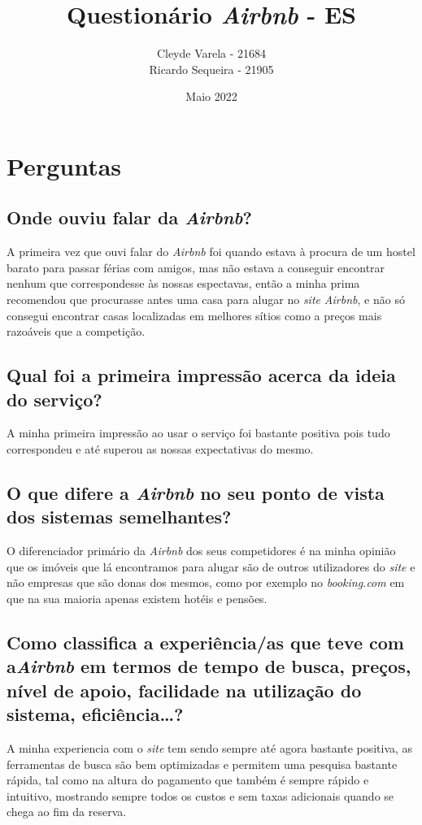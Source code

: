 \documentclass[a4paper]{article}
\title{Questionário \textit{Airbnb} - ES}
\author{Cleyde Varela - 21684 \\ Ricardo Sequeira - 21905}
\date{Maio 2022}
\begin{document}
\maketitle

\section{Perguntas}

\subsection{Onde ouviu falar da \textit{Airbnb}?}
A primeira vez que ouvi falar do \textit{Airbnb} foi quando estava à procura de um hostel barato para passar férias com amigos, mas não estava a conseguir encontrar nenhum que correspondesse às nossas espectavas, então a minha prima recomendou que procurasse antes uma casa para alugar no \textit{site} \textit{Airbnb}, e não só consegui encontrar casas localizadas em melhores sítios como a preços mais razoáveis que a competição.

\subsection{Qual foi a primeira impressão acerca da ideia do serviço?}
A minha primeira impressão ao usar o serviço foi bastante positiva pois tudo correspondeu e até superou as nossas expectativas do mesmo.

\subsection{O que difere a \textit{Airbnb} no seu ponto de vista dos sistemas semelhantes?}
O diferenciador primário da \textit{Airbnb} dos seus competidores é na minha opinião que os imóveis que lá encontramos para alugar são de outros utilizadores do \textit{site} e não empresas que são donas dos mesmos, como por exemplo no \textit{booking.com} em que na sua maioria apenas existem hotéis e pensões. 

\subsection{Como classifica a experiência/as que teve com a\textit{Airbnb} em termos de tempo de busca, preços, nível de apoio, facilidade na utilização do sistema, eficiência…?}
A minha experiencia com o \textit{site} tem sendo sempre até agora bastante positiva, as ferramentas de busca são bem optimizadas e permitem uma pesquisa bastante rápida, tal como na altura do pagamento que também é sempre rápido e intuitivo, mostrando sempre todos os custos e sem taxas adicionais quando se chega ao fim da reserva.
\end{document}
